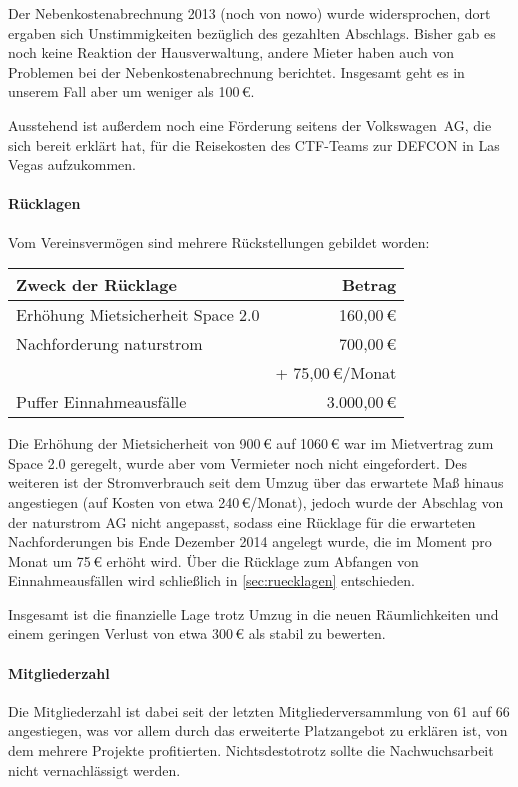 \documentclass[a4paper,12pt]{scrartcl}
\begin{document}
Der Nebenkostenabrechnung 2013 (noch von nowo) wurde widersprochen, dort ergaben
sich Unstimmigkeiten bezüglich des gezahlten Abschlags. Bisher gab es noch keine
Reaktion der Hausverwaltung, andere Mieter haben auch von Problemen bei der
Nebenkostenabrechnung berichtet. Insgesamt geht es in unserem Fall aber um
weniger als 100\,€.

Ausstehend ist außerdem noch eine Förderung seitens der Volkswagen~AG, die sich
bereit erklärt hat, für die Reisekosten des CTF-Teams zur DEFCON in Las Vegas
aufzukommen.

\paragraph{Rücklagen}\label{sec:finanzbericht-ruecklagen}
Vom Vereinsvermögen sind mehrere Rückstellungen gebildet worden:

\begin{center}
\begin{tabular}{|l|r|}
  \hline
  \textbf{Zweck der Rücklage} & \textbf{Betrag} \\
  \hline
  Erhöhung Mietsicherheit Space 2.0 &     160{,}00\,€ \\
  Nachforderung naturstrom          &     700{,}00\,€\\
                                    &    + 75{,}00\,€/Monat \\
  Puffer Einnahmeausfälle           & 3{.}000{,}00\,€ \\
  \hline
\end{tabular}
\end{center}

Die Erhöhung der Mietsicherheit von 900\,€ auf 1060\,€ war im Mietvertrag zum
Space 2.0 geregelt, wurde aber vom Vermieter noch nicht eingefordert. Des
weiteren ist der Stromverbrauch seit dem Umzug über das erwartete Maß hinaus
angestiegen (auf Kosten von etwa 240\,€/Monat), jedoch wurde der Abschlag von
der naturstrom AG nicht angepasst, sodass eine Rücklage für die erwarteten
Nachforderungen bis Ende Dezember 2014 angelegt wurde, die im Moment pro Monat
um 75\,€ erhöht wird. Über die Rücklage zum Abfangen von Einnahmeausfällen wird
schließlich in \ref{sec:ruecklagen} entschieden.

Insgesamt ist die finanzielle Lage trotz Umzug in die neuen Räumlichkeiten und
einem geringen Verlust von etwa 300\,€ als stabil zu bewerten.

\paragraph{Mitgliederzahl}
Die Mitgliederzahl ist dabei seit der letzten Mitgliederversammlung von 61 auf
66 angestiegen, was vor allem durch das erweiterte Platzangebot zu erklären ist,
von dem mehrere Projekte profitierten. Nichtsdestotrotz sollte die
Nachwuchsarbeit nicht vernachlässigt werden.
\end{document}
